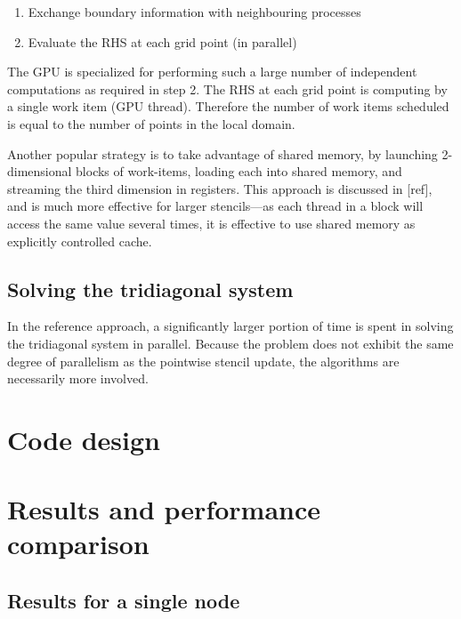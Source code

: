 \documentclass{article}
\begin{document}
        \begin{enumerate}
            \item Exchange boundary information with neighbouring processes
            \item Evaluate the RHS at each grid point (in parallel)
        \end{enumerate}

        The GPU is specialized for performing such a large number of independent
        computations as required in step 2.
        The RHS at each grid point is computing by a single work item
        (GPU thread).
        Therefore the number of work items scheduled is
        equal to the number of points in the local domain.

        Another popular strategy is to take advantage of
        shared memory, by launching 2-dimensional blocks of work-items,
        loading each into shared memory, and streaming the third dimension
        in registers.
        This approach is discussed in [ref], and is much more effective
        for larger stencils---as each thread in a block will access the same
        value several times, it is effective to use shared memory as explicitly
        controlled cache.

    \subsection{Solving the tridiagonal system}

        In the reference approach, a significantly larger portion of time is spent in solving
        the tridiagonal system in parallel.
        Because the problem does not exhibit the same degree of parallelism as
        the pointwise stencil update,
        the algorithms are necessarily more involved.

\section{Code design}

\section{Results and performance comparison}

    \subsection{Results for a single node}
\end{document}
